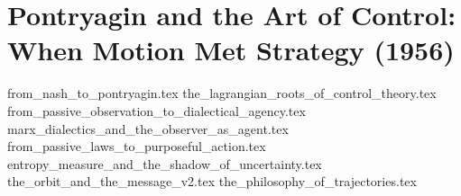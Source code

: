 \section{Pontryagin and the Art of Control: When Motion Met Strategy (1956)}

{from_nash_to_pontryagin.tex}
{the_lagrangian_roots_of_control_theory.tex}
{from_passive_observation_to_dialectical_agency.tex}
{marx_dialectics_and_the_observer_as_agent.tex}
{from_passive_laws_to_purposeful_action.tex}
{entropy_measure_and_the_shadow_of_uncertainty.tex}
{the_orbit_and_the_message_v2.tex}
{the_philosophy_of_trajectories.tex}